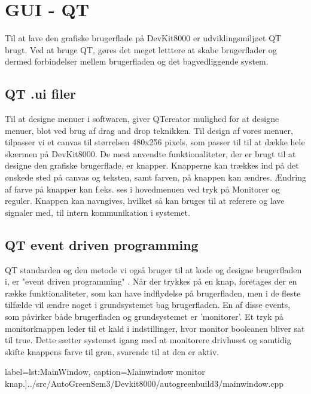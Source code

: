 \section{GUI - QT } \label{sec:QT_impl}

Til at lave den grafiske brugerflade på DevKit8000 er udviklingsmiljøet QT brugt. Ved at bruge QT, gøres det meget letttere at skabe brugerflader og dermed forbindelser mellem brugerfladen og det bagvedliggende system. 

\subsection{QT .ui filer} 

Til at designe menuer i softwaren, giver QTcreator\cite{lib:QT} mulighed for at designe menuer, blot ved brug af drag and drop teknikken. Til design af vores menuer, tilpasser vi et canvas til størrelsen 480x256 pixels, som passer til til at dække hele skærmen på DevKit8000. De mest anvendte funktionaliteter, der er brugt til at designe den grafiske brugerflade, er knapper. Knapperne kan trækkes ind på det ønskede sted på canvas og teksten, samt farven, på knappen kan ændres. Ændring af farve på knapper kan f.eks. ses i hovedmenuen ved tryk på Monitorer og reguler. Knappen kan navngives, hvilket så kan bruges til at referere og lave signaler med, til intern kommunikation i systemet.

\subsection{QT event driven programming}

QT standarden og den metode vi også bruger til at kode og designe brugerfladen i, er "event driven programming" \cite{lib:Event_driven_programming}. 
Når der trykkes på en knap, foretages der en række funktionaliteter, som kan have indflydelse på brugerfladen, men i de fleste tilfælde vil ændre noget i grundsystemet bag brugerfladen.
En af disse events, som påvirker både brugerfladen og grundsystemet er 'monitorer'. Et tryk på monitorknappen leder til et kald i indstillinger, hvor monitor booleanen bliver sat til true. Dette sætter systemet igang med at monitorere drivhuset og samtidig skifte knappens farve til grøn, svarende til at den er aktiv.

 label=lst:MainWindow, caption=Mainwindow monitor knap.]{../src/AutoGreenSem3/Devkit8000/autogreenbuild3/mainwindow.cpp}

